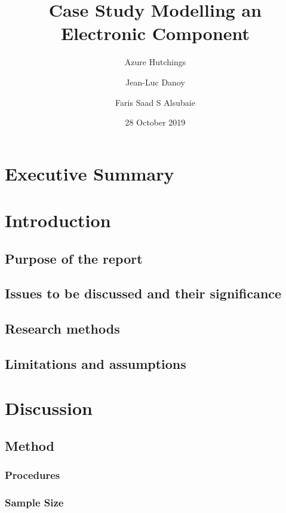 \documentclass[12pt, letterpaper, twoside]{article}
\title{Case Study Modelling an Electronic Component}
\author{
  Azure Hutchings
  \and
  Jean-Luc Danoy
  \and
  Faris Saad S Alsubaie
}
\date{28 October 2019}
\begin{document}
 
\begin{titlepage}
\maketitle
\end{titlepage}

\section{Executive Summary}

\tableofcontents

\section{Introduction}

\subsection{Purpose of the report}

\subsection{Issues to be discussed and their significance}

\subsection{Research methods}

\subsection{Limitations and assumptions}

\section{Discussion}

\subsection{Method}

\subsubsection{Procedures}

\subsubsection{Sample Size}
\end{document}
